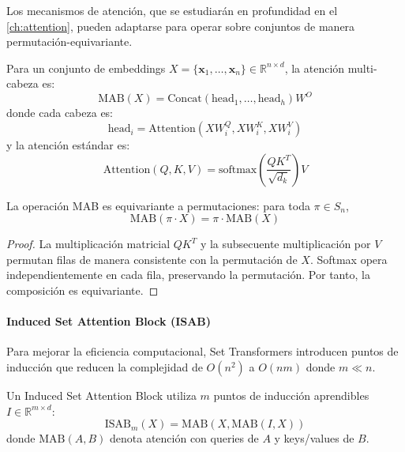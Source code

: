 Los mecanismos de atención, que se estudiarán en profundidad en el \autoref{ch:attention}, pueden adaptarse para operar sobre conjuntos de manera permutación-equivariante.

\begin{definition}\label{def:set_multihead_attention}
Para un conjunto de embeddings $X = \{\mathbf{x}_1, \ldots, \mathbf{x}_n\} \in \mathbb{R}^{n \times d}$, la atención multi-cabeza es:
\begin{equation}
\text{MAB}(X) = \text{Concat}(\text{head}_1, \ldots, \text{head}_h)W^O
\end{equation}
donde cada cabeza es:
\begin{equation}
\text{head}_i = \text{Attention}(XW_i^Q, XW_i^K, XW_i^V)
\end{equation}
y la atención estándar es:
\begin{equation}
\text{Attention}(Q, K, V) = \text{softmax}\left(\frac{QK^T}{\sqrt{d_k}}\right)V
\end{equation}
\end{definition}

\begin{proposition}
La operación MAB es equivariante a permutaciones: para toda $\pi \in S_n$,
\begin{equation}
\text{MAB}(\pi \cdot X) = \pi \cdot \text{MAB}(X)
\end{equation}
\end{proposition}

\begin{proof}
La multiplicación matricial $QK^T$ y la subsecuente multiplicación por $V$ permutan filas de manera consistente con la permutación de $X$. Softmax opera independientemente en cada fila, preservando la permutación. Por tanto, la composición es equivariante.
\end{proof}

\paragraph{Induced Set Attention Block (ISAB)}

Para mejorar la eficiencia computacional, Set Transformers introducen puntos de inducción que reducen la complejidad de $O(n^2)$ a $O(nm)$ donde $m \ll n$.

\begin{definition}[ISAB]\label{def:isab}
Un Induced Set Attention Block utiliza $m$ puntos de inducción aprendibles $I \in \mathbb{R}^{m \times d}$:
\begin{equation}
\text{ISAB}_m(X) = \text{MAB}(X, \text{MAB}(I, X))
\end{equation}
donde $\text{MAB}(A, B)$ denota atención con queries de $A$ y keys/values de $B$.
\end{definition}

